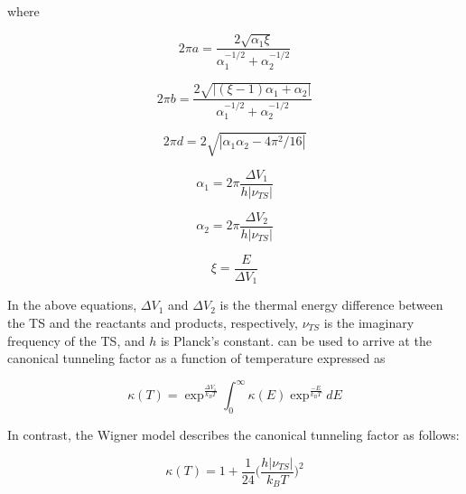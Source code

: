 \documentclass[preprint, 11pt]{elsarticle} %
\begin{document}
where

\begin{equation}
    2 \pi a = \frac{2\sqrt{\alpha_1 \xi}}{\alpha_1^{-1/2} + \alpha_2^{-1/2}}
\end{equation}

\begin{equation}
    2 \pi b = \frac{2 \sqrt{|(\xi -1)\alpha_1 + \alpha_2| }}{\alpha_1^{-1/2} + \alpha_2^{-1/2}}
\end{equation}

\begin{equation}
    2 \pi d = 2 \sqrt{|\alpha_1 \alpha_2 - 4 \pi^2 / 16|}
\end{equation}

\begin{equation}
    \alpha_1 = 2\pi \frac{\Delta V_1}{h | \nu_{TS}|}
\end{equation}

\begin{equation}
    \alpha_2 = 2\pi \frac{\Delta V_2}{h | \nu_{TS}|}
\end{equation}

\begin{equation}
    \xi = \frac{E}{\Delta V_1}
\end{equation}

In the above equations, $\Delta V_1$ and $\Delta V_2$ is the thermal energy difference between the TS and the reactants and products, respectively, $\nu_{TS}$ is the imaginary frequency of the TS, and $h$ is Planck's constant. 
 can be used to arrive at the canonical tunneling factor as a function of temperature expressed as

\begin{equation}
    \kappa (T) = \exp^{\frac{\Delta V_1}{k_B T}} \int_0^\infty \kappa(E) \exp^{\frac{-E}{k_B T}} dE
\end{equation}

In contrast, the Wigner model \cite{Winger:1932} describes the canonical tunneling factor as follows:

\begin{equation}
    \kappa (T) = 1 + \frac{1}{24} \Big( \frac{h |\nu_{TS}|}{k_B T}\Big)^2
\end{equation}

\end{document}
